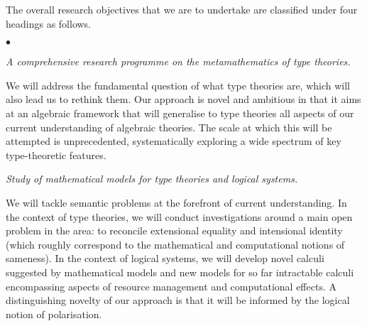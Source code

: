 \documentclass[11pt,twocolumn]{article}
\newenvironment{myitemize}
  {\begin{list}{$\bullet$}
  {\setlength{\topsep}{2pt}
   \setlength{\partopsep}{2pt}
   \setlength{\itemsep}{2.5pt}
   \setlength{\parsep}{2.5pt}
   \setlength{\leftmargin}{1em}
   \setlength{\labelwidth}{.5em}}}
  {\end{list}}
\newcommand{\hidewiring}[1]{}
\begin{document}
The overall research objectives that we are to undertake are classified
under four headings as follows.
\begin{myitemize}
\item[{\bfseries 1\enspace Foundations:}]\mbox{}\enspace\thinspace 
%
  \emph{A comprehensive research programme on the metamathematics of type
    theories.}

  We will address the fundamental question of what type theories are,
  which will also lead us to rethink them.  Our approach is novel and
  ambitious in that it aims at an algebraic framework that will generalise
  to type theories all aspects of our current understanding of algebraic
  theories. %
  The scale at which this will be attempted is unprecedented,
  systematically exploring a wide spectrum of key type-theoretic features.

\item[{\bfseries 2\enspace Models:}]\mbox{}\enspace\thinspace
%  
  \emph{Study of mathematical models for type theories and logical systems.}

  We will tackle semantic problems at the forefront of current understanding.
  In the context of type theories, we will conduct investigations around a
  main open problem in the area: to reconcile extensional equality and
  intensional identity (which roughly correspond to the mathematical and
  computational notions of sameness).  
  In the context of logical systems, we will develop novel calculi suggested
  by mathematical models and new models for so far intractable calculi
  encompassing aspects of resource management and computational effects.  A
  distinguishing novelty of our approach is that it will be informed by the
  logical notion of polarisation.


\end{myitemize}
\end{document}
